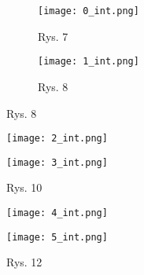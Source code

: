 \begin{figure}[!h]
    \centering
    \begin{subfigure}{.5\textwidth}
      \centering
      \texttt{[image: 0\_int.png]}
      \caption*{Rys. 7}
      \label{fig:sub1}
    \end{subfigure}%
    \begin{subfigure}{.5\textwidth}
      \centering
      \texttt{[image: 1\_int.png]}
      \caption*{Rys. 8}
      \label{fig:sub2}
    \end{subfigure}
    \label{fig:test}
    \end{figure}


    \begin{figure}[!h]
    \centering
    \begin{minipage}{.5\textwidth}
      \centering
      \texttt{[image: 2\_int.png]}
      \caption*{Rys. 9}
      \label{fig:test1}
    \end{minipage}%
    \begin{minipage}{.5\textwidth}
      \centering
      \texttt{[image: 3\_int.png]}
      \caption*{Rys. 10}
      \label{fig:test2}
    \end{minipage}
    \end{figure}
    \begin{figure}[!h]
        \centering
        \begin{minipage}{.5\textwidth}
          \centering
          \texttt{[image: 4\_int.png]}
          \caption*{Rys. 11}
          \label{fig:test1}
        \end{minipage}%
        \begin{minipage}{.5\textwidth}
          \centering
          \texttt{[image: 5\_int.png]}
          \caption*{Rys. 12}
          \label{fig:test2}
        \end{minipage}
        \end{figure}